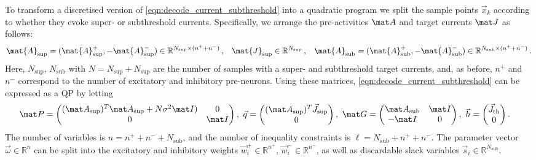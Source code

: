 To transform a discretised version of \cref{eqn:decode_current_subthreshold} into a quadratic program we split the sample points $\vec x_k$ according to whether they evoke super- or subthreshold currents.
Specifically, we arrange the pre-activities $\mat A$ and target currents $\mat J$ as follows:
\begin{align*}
	\mat{A}_\mathrm{sup} = (
		  \mat{A}^+_\mathrm{sup}, 
		- \mat{A}^-_\mathrm{sup})
		\in
		\mathbb{R}^{N_\mathrm{sup} \times (n^+ + n^-)} \,,
	&&
	\mat{J}_\mathrm{sup} \in \mathbb{R}^{N_\mathrm{sup}} \,,
	&&
	\mat{A}_\mathrm{sub} = (
		  \mat{A}^+_\mathrm{sub}, 
		- \mat{A}^-_\mathrm{sub})
		\in
		\mathbb{R}^{N_\mathrm{sub} \times (n^+ + n^-)} \,.
\end{align*}
Here, $N_\mathrm{sup}$, $N_\mathrm{sub}$ with $N = N_\mathrm{sup} + N_\mathrm{sup}$
are the number of samples with a super- and subthreshold target currents, and, as before, $n^+$ and $n^-$ correspond to the number of excitatory and inhibitory pre-neurons.
Using these matrices, \cref{eqn:decode_current_subthreshold} can be expressed as a QP by letting
\begingroup
\setlength\fboxsep{2pt}
\newcommand{\cA}{LightSkyBlue}
\newcommand{\cB}{Plum}
\newcommand{\cC}{Salmon}
\newcommand{\cD}{Khaki}
\newcommand{\hlA}[1]{{\ensuremath{#1}}}
\newcommand{\hlB}[1]{{\ensuremath{#1}}}
\newcommand{\hlC}[1]{{\ensuremath{#1}}}
\newcommand{\hlD}[1]{{\ensuremath{#1}}}
\begin{align}
	\mat P &= \begin{pmatrix}
		  \hlA{(\mat A_\mathrm{sup})^T \mat A_\mathrm{sup} + N \sigma^2 \mat I)}
		& 0 \\
		  0
		& \hlB{\mat I}
	\end{pmatrix} ,
	&
	\!\!\! \vec q &= \begin{pmatrix}
		\hlA{(\mat A_\mathrm{sup})^T \vec J_\mathrm{sup}} \\
	0
	\end{pmatrix} ,
	&
	\!\!\! \mat G &= \begin{pmatrix}
		\hlC{\mat A_\mathrm{sub}} & \hlB{\mat I} \\
		\hlD{-\mat I} & 0
	\end{pmatrix} ,
	&
	\!\!\! \vec h &= \begin{pmatrix}
		\hlC{\vec{J}_\mathrm{th}} \\
		\hlD{0}
	\end{pmatrix} .
	\label{eqn:decode_subthreshold_qp}
\end{align}
The number of variables is $n = n^+ + n^- + N_\mathrm{sub}$, and the number of inequality constraints is $\ell = N_\mathrm{sub} + n^+ + n^-$.
The parameter vector $\vec \omega \in \mathbb{R}^{n}$ can be split into the excitatory and inhibitory weights $\vec w_i^+ \in \mathbb{R}^{n^+}$, $\vec w_i^- \in \mathbb{R}^{n^-}$, as well as discardable slack variables $\vec s_i \in \mathbb{R}^{N_\mathrm{sub}}$.

